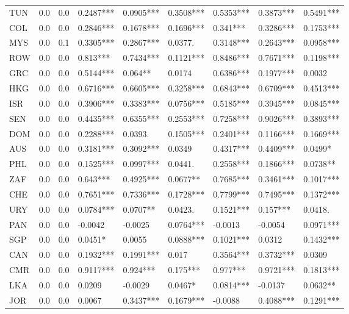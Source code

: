 \begin{table}[ht]
\begin{tabular}{lrrllllll}
  TUN & 0.0 & 0.0 & 0.2487*** & 0.0905*** & 0.3508*** & 0.5353*** & 0.3873*** & 0.5491*** \\ 
  COL & 0.0 & 0.0 & 0.2846*** & 0.1678*** & 0.1696*** & 0.341*** & 0.3286*** & 0.1753*** \\ 
  MYS & 0.0 & 0.1 & 0.3305*** & 0.2867*** & 0.0377. & 0.3148*** & 0.2643*** & 0.0958*** \\ 
  ROW & 0.0 & 0.0 & 0.813*** & 0.7434*** & 0.1121*** & 0.8486*** & 0.7671*** & 0.1198*** \\ 
  GRC & 0.0 & 0.0 & 0.5144*** & 0.064** & 0.0174  & 0.6386*** & 0.1977*** & 0.0032  \\ 
  HKG & 0.0 & 0.0 & 0.6716*** & 0.6605*** & 0.3258*** & 0.6843*** & 0.6709*** & 0.4513*** \\ 
  ISR & 0.0 & 0.0 & 0.3906*** & 0.3383*** & 0.0756*** & 0.5185*** & 0.3945*** & 0.0845*** \\ 
  SEN & 0.0 & 0.0 & 0.4435*** & 0.6355*** & 0.2553*** & 0.7258*** & 0.9026*** & 0.3893*** \\ 
  DOM & 0.0 & 0.0 & 0.2288*** & 0.0393. & 0.1505*** & 0.2401*** & 0.1166*** & 0.1669*** \\ 
  AUS & 0.0 & 0.0 & 0.3181*** & 0.3092*** & 0.0349  & 0.4317*** & 0.4409*** & 0.0499* \\ 
  PHL & 0.0 & 0.0 & 0.1525*** & 0.0997*** & 0.0441. & 0.2558*** & 0.1866*** & 0.0738** \\ 
  ZAF & 0.0 & 0.0 & 0.643*** & 0.4925*** & 0.0677** & 0.7685*** & 0.3461*** & 0.1017*** \\ 
  CHE & 0.0 & 0.0 & 0.7651*** & 0.7336*** & 0.1728*** & 0.7799*** & 0.7495*** & 0.1372*** \\ 
  URY & 0.0 & 0.0 & 0.0784*** & 0.0707** & 0.0423. & 0.1521*** & 0.157*** & 0.0418. \\ 
  PAN & 0.0 & 0.0 & -0.0042  & -0.0025  & 0.0764*** & -0.0013  & -0.0054  & 0.0971*** \\ 
  SGP & 0.0 & 0.0 & 0.0451* & 0.0055  & 0.0888*** & 0.1021*** & 0.0312  & 0.1432*** \\ 
  CAN & 0.0 & 0.0 & 0.1932*** & 0.1991*** & 0.017  & 0.3564*** & 0.3732*** & 0.0309  \\ 
  CMR & 0.0 & 0.0 & 0.9117*** & 0.924*** & 0.175*** & 0.977*** & 0.9721*** & 0.1813*** \\ 
  LKA & 0.0 & 0.0 & 0.0209  & -0.0029  & 0.0467* & 0.0814*** & -0.0137  & 0.0632** \\ 
  JOR & 0.0 & 0.0 & 0.0067  & 0.3437*** & 0.1679*** & -0.0088  & 0.4088*** & 0.1291*** \\ 

\end{tabular}
\end{table}
